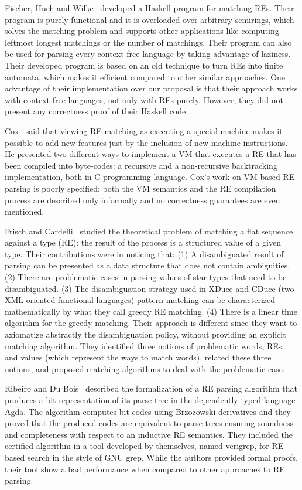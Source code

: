 \documentclass[review]{elsarticle}
\theoremstyle{definition}
\begin{document}
Fischer, Huch and Wilke~\cite{Fischer2010} developed a Haskell program for matching REs. Their program is purely
functional and it is overloaded over arbitrary semirings, which solves the matching problem and supports other
applications like computing leftmost longest matchings or the number of matchings. Their program can also be used
for parsing every context-free language by taking advantage of laziness. Their developed program is based on an
old technique to turn REs into finite automata, which makes it efficient compared to other similar approaches.
One advantage of their implementation over our proposal is that their approach works with context-free languages,
not only with REs purely. However, they did not present any correctness proof of their Haskell code.

Cox~\cite{Cox2009} said that viewing RE matching as executing a special machine makes it possible to add new
features just by the inclusion of new machine instructions. He presented two different ways to implement
a VM that executes a RE that has been compiled into  byte-codes: a recursive and a non-recursive
backtracking implementation, both in C programming language. Cox's work on VM-based RE parsing is poorly specified:
both the VM semantics and the RE compilation process are described only informally
and no correctness guarantees are even mentioned.

Frisch and Cardelli~\cite{Frisch2004} studied the theoretical problem of matching a flat sequence against a type (RE): the
result of the process is a structured value of a given type. Their contributions were in noticing that: (1) A disambiguated
result of parsing can be presented as a data structure that does not contain ambiguities. (2) There are problematic cases in
parsing values of star types that need to be disambiguated. (3) The disambiguation strategy used in XDuce and CDuce (two
XML-oriented functional languages) pattern matching can be characterized mathematically by what they call greedy RE matching.
(4) There is a linear time algorithm for the greedy matching. Their approach is different since they want to axiomatize abstractly
the disambiguation policy, without providing an explicit matching algorithm. They identified three notions of problematic words, REs,
and values (which represent the ways to match words), related these three notions, and proposed matching algorithms to deal with the
problematic case.

Ribeiro and Du Bois~\cite{Ribeiro2017} described the formalization of a RE parsing algorithm that produces a bit representation
of its parse tree in the dependently typed language Agda. The algorithm computes bit-codes using Brzozowski derivatives and
they proved that the produced codes are equivalent to parse trees ensuring soundness and completeness with respect to an
inductive RE semantics. They included the certified algorithm in a tool developed by themselves, named verigrep, for RE-based
search in the style of GNU grep. While the authors provided formal proofs, their tool show a bad performance when compared to
other approaches to RE parsing.
\end{document}
